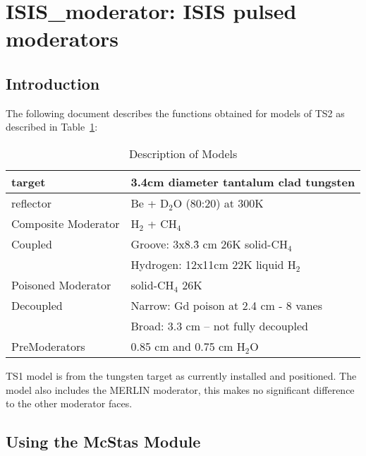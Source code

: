 \section{ISIS\_moderator: ISIS pulsed moderators}
\label{isis-moderator}


\subsection{Introduction}

The following document describes the functions obtained for models of
TS2 as described in Table~\ref{desc}:

\begin{table}[h]
\begin{center}
\begin{tabular}{|l|l|}
\hline
target & 3.4cm diameter tantalum clad tungsten \\
\hline
reflector & Be + D$_2$O (80:20) at 300K \\
\hline
Composite Moderator & H$_2$ + CH$_4$ \\
Coupled         & Groove: 3x8.\.{3} cm 26K solid-CH$_4$ \\
                & Hydrogen: 12x11cm 22K liquid H$_2$ \\
\hline
Poisoned Moderator &  solid-CH$_4$ 26K  \\
Decoupled           & Narrow: Gd poison at 2.4 cm - 8 vanes\\
                    &  Broad: 3.3 cm -- not fully decoupled \\
\hline
PreModerators & 0.85 cm and 0.75 cm H$_2$O \\
\hline
\end{tabular}
\caption{Description of Models}
\label{desc}
\end{center}
\end{table}

TS1 model is from the tungsten target as currently installed and
positioned. The model also includes the MERLIN moderator, this
makes no significant difference to the other moderator faces.




\subsection{Using the McStas Module}

